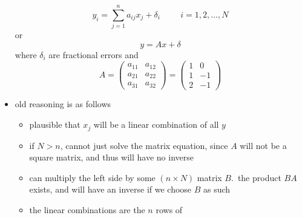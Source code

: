\documentclass[../jaynes_prob_theory_notes.tex]{subfiles}
\begin{document}
\begin{itemize}
                    \begin{equation*} 
                        y_i = \sum\limits^{n}_{j=1} a_{ij} x_j + {\delta}_i \hspace{1cm} i = 1, 2, \ldots, N
                    \end{equation*}
                    or 
                    \begin{equation*} 
                        y = Ax + \delta
                    \end{equation*}
                    where \({\delta}_i\) are fractional errors and 
                    \begin{equation*} 
                        A = \left( \begin{matrix} a_{11} & a_{12} \\ a_{21} & a_{22} \\ a_{31} & a_{32} \end{matrix} \right) = \left( \begin{matrix} 1 & 0 \\ 1 & -1 \\ 2 & -1 \end{matrix}\right)
                    \end{equation*}
                \item old reasoning is as follows
                    \begin{itemize} 
                        \item plausible that \(x_j\) will be a linear combination of all \(y\)
                        \item if \(N > n\), cannot just solve the matrix equation, since \(A\) will not be a square matrix, and thus will have no inverse
                        \item can multiply the left side by some \((n \times N)\) matrix \(B\).\ the product \(BA\) exists, and will have an inverse if we choose \(B\) as such
                        \item the linear combinations are the \(n\) rows of 
                            \begin{equation*} 

\end{equation*}
\end{itemize}
\end{itemize}
\end{document}
